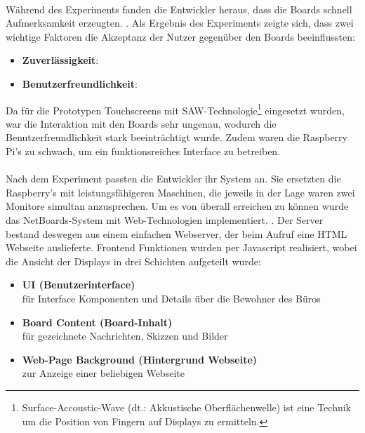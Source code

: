 \\
Während des Experiments fanden die Entwickler heraus, dass die Boards schnell Aufmerksamkeit erzeugten. .
Als Ergebnis des Experiments zeigte sich, dass zwei wichtige Faktoren die Akzeptanz der Nutzer gegenüber den Boards beeinflussten:
\begin{itemize}
  \item \textbf{Zuverlässigkeit}: 
  \item \textbf{Benutzerfreundlichkeit}: 
\end{itemize}
Da für die Prototypen Touchscreens mit SAW-Technologie\footnote{Surface-Accoustic-Wave (dt.: Akkustische Oberflächenwelle) ist eine Technik um die Position von Fingern auf Displays zu ermitteln.} eingesetzt wurden, war die Interaktion mit den Boards sehr ungenau, wodurch die Benutzerfreundlichkeit stark beeinträchtigt wurde.
Zudem waren die Raspberry Pi's zu schwach, um ein funktionsreiches Interface zu betreiben.
\\
\\
Nach dem Experiment passten die Entwickler ihr System an.
Sie ersetzten die Raspberry's mit leistungsfähigeren Maschinen, die jeweils in der Lage waren zwei Monitore simultan anzusprechen.
Um es von überall erreichen zu können wurde das NetBoards-System mit Web-Technologien implementiert. .
Der Server bestand deswegen aus einem einfachen Webserver, der beim Aufruf eine HTML Webseite auslieferte. Frontend Funktionen wurden per Javascript realisiert, wobei die Ansicht der Displays in drei Schichten aufgeteilt wurde\cite{wood:2014}:
\begin{itemize}
  \item \textbf{UI (Benutzerinterface)}\\
    für Interface Komponenten und Details über die Bewohner des Büros
  \item \textbf{Board Content (Board-Inhalt)}\\
    für gezeichnete Nachrichten, Skizzen und Bilder
  \item \textbf{Web-Page Background (Hintergrund Webseite)}\\
    zur Anzeige einer beliebigen Webseite
\end{itemize}
